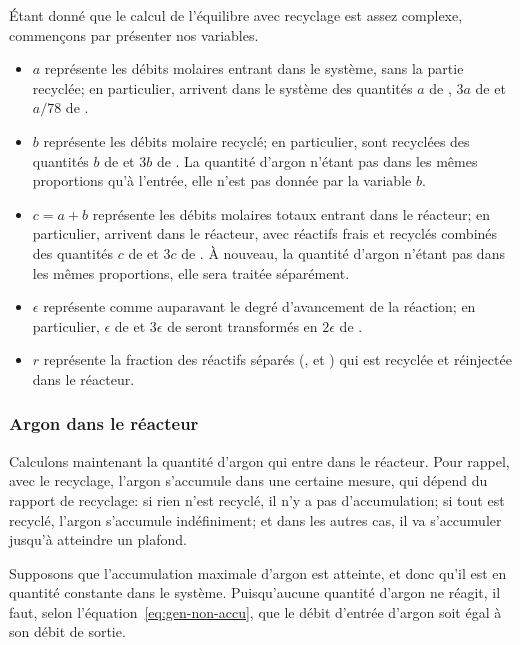 Étant donné que le calcul de l'équilibre avec recyclage est assez complexe,
commençons par présenter nos variables.
\begin{itemize}
    \item $a$ représente les débits molaires entrant dans le système,
        sans la partie recyclée; en particulier, arrivent dans le système
        des quantités
        $a$ de , $3a$ de  et $a/78$ de .
    \item $b$ représente les débits molaire recyclé;
        en particulier, sont recyclées 
        des quantités $b$ de  et $3b$ de .
        La quantité d'argon n'étant pas dans les mêmes proportions
        qu'à l'entrée, elle n'est pas donnée par la variable $b$.
    \item $c = a+b$ représente les débits molaires
        totaux entrant dans le réacteur;
        en particulier, arrivent dans le réacteur, avec réactifs frais et
        recyclés combinés des quantités
        $c$ de  et $3c$ de .
        À nouveau, la quantité d'argon n'étant pas dans les mêmes proportions,
        elle sera traitée séparément.
    \item $\epsilon$ représente comme auparavant
        le degré d'avancement de la réaction;
        en particulier, $\epsilon$ de  et $3\epsilon$ de 
        seront transformés en $2\epsilon$ de .
    \item $r$ représente la fraction des réactifs séparés
        (,  et ) qui est recyclée et réinjectée
        dans le réacteur.
\end{itemize}

\subsubsection{Argon dans le réacteur}

Calculons maintenant la quantité d'argon qui entre dans le réacteur.
Pour rappel, avec le recyclage, l'argon s'accumule dans une certaine mesure,
qui dépend du rapport de recyclage: si rien n'est recyclé, il n'y a pas
d'accumulation; si tout est recyclé, l'argon s'accumule indéfiniment;
et dans les autres cas, il va s'accumuler jusqu'à atteindre un plafond.

Supposons que l'accumulation maximale d'argon est atteinte,
et donc qu'il est en quantité constante dans le système.
Puisqu'aucune quantité d'argon ne réagit, il faut,
selon l'équation~\ref{eq:gen-non-accu}, que le débit d'entrée d'argon soit égal
à son débit de sortie.

